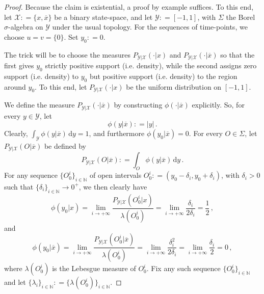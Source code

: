 \documentclass[twoside,11pt]{article}
\newcommand{\nats}{\mathbb{N}}
\newcommand{\states}{\mathcal{X}}
\newcommand{\observs}{\mathcal{Y}}
\newcommand{\abs}[1]{\left\vert #1 \right\vert}
\newcommand{\coloneqq}{:\!=}
\begin{document}
\begin{proof}
Because the claim is existential, a proof by example suffices. To this end, let $\states\coloneqq\{x,\overline{x}\}$ be a binary state-space, and let $\observs\coloneqq [-1,1]$, with $\Sigma$ the Borel $\sigma$-algebra on $\observs$ under the usual topology. For the sequences of time-points, we choose $u=v=\{0\}$. Set $y_0\coloneqq 0$.

The trick will be to choose the measures $P_{\observs\vert\states}(\cdot\vert x)$ and $P_{\observs\vert\states}(\cdot\vert \overline{x})$ so that the first gives $y_0$ strictly positive support (i.e. density), while the second assigns zero support (i.e. density) to $y_0$ but positive support (i.e. density) to the region around $y_0$. To this end, let $P_{\observs\vert\states}(\cdot\vert x)$ be the uniform distribution on $[-1,1]$.

We define the measure $P_{\observs\vert\states}(\cdot\vert \overline{x})$ by constructing $\phi(\cdot\vert\overline{x})$ explicitly. So, for every $y\in\observs$, let
\begin{equation*}
\phi(y\vert\overline{x}) \coloneqq \abs{y}\,.
\end{equation*}
Clearly, $\int_\observs \phi(y\vert\overline{x})\,\mathrm{d}y = 1$, and furthermore $\phi(y_0\vert\overline{x})=0$. For every $O\in\Sigma$, let $P_{\observs\vert\states}(O\vert\overline{x})$ be defined by
\begin{equation*}
P_{\observs\vert\states}(O\vert\overline{x}) \coloneqq \int_O\phi(y\vert\overline{x})\,\mathrm{d}y\,.
\end{equation*}
For any sequence $\{O_0^i\}_{i\in\nats}$ of open intervals $O_0^i\coloneqq (y_0-\delta_i,y_0+\delta_i)$, with $\delta_i>0$ such that $\{\delta_i\}_{i\in\nats}\to0^+$, we then clearly have
\begin{equation*}
\phi(y_0\vert x) = \lim_{i\to+\infty} \frac{P_{\observs\vert\states}(O_0^i\vert x)}{\lambda(O_0^i)} = \lim_{i\to+\infty} \frac{\delta_i}{2\delta_i} = \frac{1}{2}\,,
\end{equation*}
and
\begin{equation*}
\phi(y_0\vert \overline{x}) = \lim_{i\to+\infty} \frac{P_{\observs\vert\states}(O_0^i\vert \overline{x})}{\lambda(O_0^i)} = \lim_{i\to+\infty} \frac{\delta_i^2}{2\delta_i} = \lim_{i\to+\infty} \frac{\delta_i}{2} = 0\,,
\end{equation*}
where $\lambda(O_0^i)$ is the Lebesgue measure of $O_0^i$. Fix any such sequence $\{O_0^i\}_{i\in\nats}$ and let $\{\lambda_i\}_{i\in\nats}\coloneqq\{\lambda(O_0^i)\}_{i\in\nats}$.


\end{proof}
\end{document}
